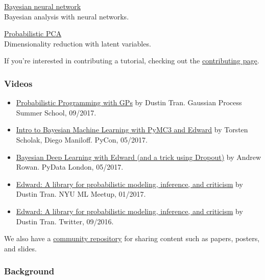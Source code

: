 \href{bayesian-neural-network}{Bayesian neural network} \\
Bayesian analysis with neural networks.

\href{probabilistic-pca}{Probabilistic PCA} \\
Dimensionality reduction with latent variables.

If you're interested in contributing a tutorial, checking out the
\href{/contributing}{contributing page}.

\subsubsection{Videos}

\begin{itemize}
  \item
  \href{https://www.youtube.com/watch?list=PLpTp0l_CVmgwyAthrUmmdIFiunV1VvicM&v=1zNNLHyeWok}
  {Probabilistic Programming with GPs}
  by Dustin Tran. Gaussian Process Summer School, 09/2017.
  \item
  \href{https://youtu.be/fR5Wvb86-IU}
  {Intro to Bayesian Machine Learning with PyMC3 and Edward}
  by Torsten Scholak, Diego Maniloff. PyCon, 05/2017.
  \item
  \href{https://www.youtube.com/watch?v=I09QVNrUS3Q}
  {Bayesian Deep Learning with Edward (and a trick using Dropout)}
  by Andrew Rowan. PyData London, 05/2017.
  \item
  \href{http://bit.ly/2k9QM3J}
  {Edward: A library for probabilistic modeling, inference, and
  criticism}
  by Dustin Tran. NYU ML Meetup, 01/2017.
  \item
  \href{https://www.pscp.tv/hugo_larochelle/1yNGanvpOPjJj}
  {Edward: A library for probabilistic modeling, inference, and criticism}
  by Dustin Tran. Twitter, 09/2016.
\end{itemize}

We also have a
\href{https://github.com/edwardlib/papers}{community repository}
for sharing content such as papers, posters, and slides.

\subsubsection{Background}

